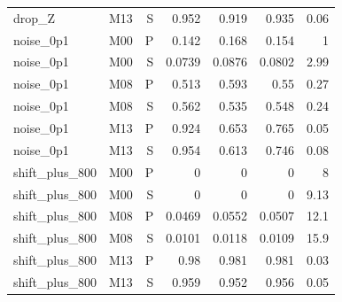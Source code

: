 \begin{table}[!ht]
{\begin{tabular}{lrrrrrr}
drop\_Z & M13 & S & 0.952 & 0.919 & 0.935 & 0.06 \\
noise\_0p1 & M00 & P & 0.142 & 0.168 & 0.154 & 1 \\
noise\_0p1 & M00 & S & 0.0739 & 0.0876 & 0.0802 & 2.99 \\
noise\_0p1 & M08 & P & 0.513 & 0.593 & 0.55 & 0.27 \\
noise\_0p1 & M08 & S & 0.562 & 0.535 & 0.548 & 0.24 \\
noise\_0p1 & M13 & P & 0.924 & 0.653 & 0.765 & 0.05 \\
noise\_0p1 & M13 & S & 0.954 & 0.613 & 0.746 & 0.08 \\
shift\_plus\_800 & M00 & P & 0 & 0 & 0 & 8 \\
shift\_plus\_800 & M00 & S & 0 & 0 & 0 & 9.13 \\
shift\_plus\_800 & M08 & P & 0.0469 & 0.0552 & 0.0507 & 12.1 \\
shift\_plus\_800 & M08 & S & 0.0101 & 0.0118 & 0.0109 & 15.9 \\
shift\_plus\_800 & M13 & P & 0.98 & 0.981 & 0.981 & 0.03 \\
shift\_plus\_800 & M13 & S & 0.959 & 0.952 & 0.956 & 0.05 \\
\bottomrule
\end{tabular}
}
\end{table}

\begin{table}[!ht]
\centering
\small
\caption{Preregistered refinement cohorts report candidate-to-baseline error ratios and bootstrap intervals; values above one favor the baseline.}
\label{tab:generated-refinement}
\end{table}
